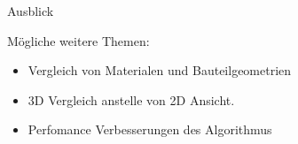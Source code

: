 \documentclass[../slides.tex]{subfiles}
\begin{document}
  \begin{frame}{Ausblick}
    \begin{minipage}[h]{.6\textwidth}
        \begin{block}{Mögliche weitere Themen:}
            \begin{itemize}
                \item Vergleich von Materialen und Bauteilgeometrien
                \item 3D Vergleich anstelle von 2D Ansicht.
                \item Perfomance Verbesserungen des Algorithmus
            \end{itemize}
        \end{block}
    \end{minipage}
    \hfill
    \begin{minipage}[h]{.39\textwidth}       
    \end{minipage}
  \end{frame}
\end{document}

